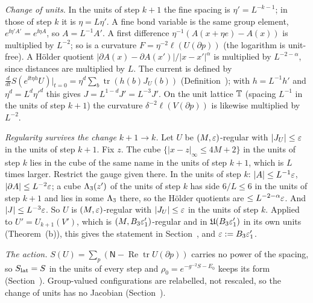 \begin{detail}\label{d7:units}
\begin{step}
\emph{Change of units.} In the units of step $k+1$ the fine spacing is $\eta'=L^{-k-1}$; in those of step $k$ it is $\eta=L\eta'$. A fine bond variable is the same group element, $e^{\ii\eta'A'}=e^{\ii\eta A}$, so $A=L^{-1}A'$. A first difference $\eta^{-1}(A(x+\eta e)-A(x))$ is multiplied by $L^{-2}$; so is a curvature $F=\eta^{-2}\ell(U(\partial p))$ (the logarithm is unit-free). A H\"older quotient $|\partial A(x)-\partial A(x')|/|x-x'|^\alpha$ is multiplied by $L^{-2-\alpha}$, since distances are multiplied by $L$. The current is defined by $\frac d{dt}S(e^{\ii t\eta h}U)|_{t=0}=\eta^d\sum_b\operatorname{tr}(h(b)J_U(b))$ (Definition~); with $h=L^{-1}h'$ and $\eta^d=L^d\eta'^d$ this gives $J=L^{1-d}J'=L^{-3}J'$. On the unit lattice $\mathbb T$ (spacing $L^{-1}$ in the units of step $k+1$) the curvature $\delta^{-2}\ell(V(\partial p))$ is likewise multiplied by $L^{-2}$.
\end{step}
\begin{step}
\emph{Regularity survives the change $k+1\to k$.} Let $U$ be $(M,\varepsilon)$-regular with $|J_U|\le\varepsilon$ in the units of step $k+1$. Fix $z$. The cube $\{|x-z|_\infty\le4M+2\}$ in the units of step $k$ lies in the cube of the same name in the units of step $k+1$, which is $L$ times larger. Restrict the gauge given there. In the units of step $k$: $|A|\le L^{-1}\varepsilon$, $|\partial A|\le L^{-2}\varepsilon$; a cube $\Lambda_3(z')$ of the units of step $k$ has side $6/L\le6$ in the units of step $k+1$ and lies in some $\Lambda_3$ there, so the H\"older quotients are $\le L^{-2-\alpha}\varepsilon$. And $|J|\le L^{-3}\varepsilon$. So $U$ is $(M,\varepsilon)$-regular with $|J_U|\le\varepsilon$ in the units of step $k$. Applied to $U'=U_{k+1}(V')$, which is $(M,B_3\varepsilon'_1)$-regular and in $\mathfrak U(B_3\varepsilon'_1)$ in its own units (Theorem~(b)), this gives the statement in Section~, and $\varepsilon:=B_3\varepsilon'_1$.
\end{step}
\begin{step}
\emph{The action.} $S(U)=\sum_p(\mathsf N-\operatorname{Re}\operatorname{tr}U(\partial p))$ carries no power of the spacing, so $S_{\rm lat}=S$ in the units of every step and $\rho_0=e^{-g^{-2}S-E_0}$ keeps its form (Section~). Group-valued configurations are relabelled, not rescaled, so the change of units has no Jacobian (Section~).
\end{step}
\end{detail}

